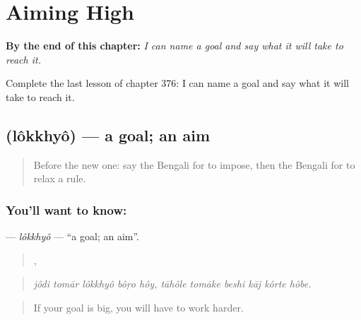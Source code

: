 
\chapter{Aiming High}
\label{ch:bn-aiming-high}

\begin{chapteropening}
\textbf{By the end of this chapter:} \emph{I can name a goal and say what it will take to reach it.}

Complete the last lesson of chapter 376: I can name a goal and say what it will take to reach it.
\end{chapteropening}

\section[\texorpdfstring{\bn{লক্ষ্য} (lôkkhyô)}{লক্ষ্য (lôkkhyô)}]{ (lôkkhyô) — a goal; an aim}

\label{lesson:BN-C376-lokkhyo}



\begin{quote}
Before the new one: say the Bengali for to impose, then the Bengali for to relax a rule.
\end{quote}

\subsection*{You'll want to know: }
\textbf{} — \emph{lôkkhyô} — \textquotedblleft{}a goal; an aim\textquotedblright{}.

\begin{quote}
    ,      
\end{quote}

\begin{quote}
\emph{jôdi tomār lôkkhyô bôṛo hôy, tāhôle tomāke beshi kāj kôrte hôbe.}
\end{quote}

\begin{quote}
If your goal is big, you will have to work harder.
\end{quote}


